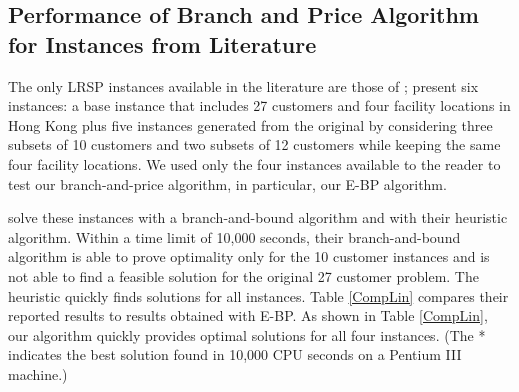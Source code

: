 \subsection{Performance of Branch and Price Algorithm for Instances from Literature}
\label{compareLin}
The only LRSP instances available in the literature are those of \citet{Lin};
\citet{Lin} present six instances: a base instance that includes
27 customers and four facility locations in Hong Kong plus five instances
generated from the original by considering three subsets of 10 customers and two subsets
of 12 customers while keeping the same four facility locations. We used only
the four instances available to the reader to test our branch-and-price algorithm,
in particular, our E-BP algorithm.

\citet{Lin} solve these instances with a branch-and-bound algorithm
and with their heuristic algorithm.  Within a time limit of 10,000 seconds, their
branch-and-bound algorithm is able to prove optimality only for the 10 customer
instances and is not able to find a feasible solution for the original 27 customer problem.
The heuristic quickly finds solutions for all instances.
Table \ref{CompLin} compares their reported results
to results obtained with E-BP. As shown in Table \ref{CompLin},
our algorithm quickly provides optimal solutions for all four instances.  (The * indicates
the best solution found in 10,000 CPU seconds on a Pentium III machine.)

